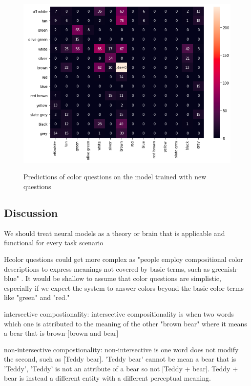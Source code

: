 \begin{figure}[H]
\includegraphics[scale=0.45]{images/HeatmapAfter.png}
\label{fig:HeatmapAfter}
\caption{Predictions of color questions on the model trained with new questions}
\end{figure}





\subsection{Discussion}

We should treat neural models as a theory or brain that is applicable and functional for every task scenario \cite{regier1996human}  

\cite{dobnik2009teaching}

Hcolor questions could get more complex as "people employ compositional color descriptions to express meanings not covered by basic terms, such as greenish-blue" \cite{monroe2016learning}. It would be shallow to assume that color questions are simplistic, especially if we expect the system to answer colors beyond the basic color terms like "green" and "red." 

\cite{monroe2017colors}


intersective compostionality: intersective compositionality is when two words which one is attributed to the meaning of the other "brown bear" where it means a bear that is brown-[brown and bear] 

non-intersective compostionality: non-intersective is one word does not modify the second, such as [Teddy bear]. 'Teddy bear' cannot be mean a bear that is 'Teddy', 'Teddy' is not an attribute of a bear so not [Teddy + bear]. Teddy + bear is instead a different entity with a different perceptual meaning. \cite{larsson-2017-compositionality} 

